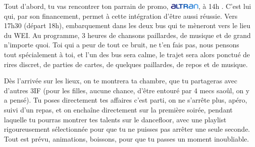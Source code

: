 Tout d'abord, tu vas rencontrer ton parrain de promo,
     \includegraphics[height=7.5pt]{images/logoAltran.jpg}, à 14h
. C'est lui qui,
par son financement, permet à cette intégration d'être aussi réussie.
Vers 17h30 (départ 18h), embarquement dans les deux bus qui te mèneront vers le lieu du
WEI. Au programme, 3 heures de chansons paillardes, de musique et de grand
n'importe quoi.
Toi qui a peur de tout ce bruit, ne t'en fais pas, nous pensons tout
spécialement à toi, et l'un des bus sera calme, le trajet sera alors ponctué de
rires discret, de parties de cartes, de quelques paillardes, de repos et de
musique.

Dès l'arrivée sur les lieux, on te montrera ta chambre, que tu partageras avec
d'autres 3IF (pour les filles, aucune chance, d'être entouré par 4 mecs saoûl,
on y a pensé). Tu poses directement tes affaires c'est parti, on ne s'arrête
plus, apéro, suivi d'un repas, et on enchaîne directement sur la première
soirée, pendant laquelle tu pourras montrer tes talents sur le dancefloor, avec
une playlist rigoureusement sélectionnée pour que tu ne puisses pas arrêter une
seule seconde. Tout est prévu, animations, boissons, pour que tu passes un
moment inoubliable.
  
